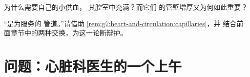 \begin{exercise}[$\star\star$]\label{exo:g7:heart-and-circulation:11}
为什么需要自己的小供血，
其腔室中充满？而它们
的管壁增厚又为何如此重要？
\end{exercise}

\begin{exercise}[$\star\star\star$]\label{exo:g7:heart-and-circulation:12}
“是为服务的
管道。”请借助
\cref{rem:g7:heart-and-circulation:capillaries}，并
结合前面章节中的两种交换，为这一论断辩护。
\end{exercise}

\section{问题：心脏科医生的一个上午}

